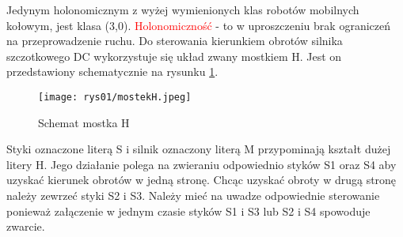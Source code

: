 	Jedynym holonomicznym z wyżej wymienionych klas robotów mobilnych kołowym, jest klasa (3,0). \newline \newline \newline
	\textcolor{red}{Holonomiczność} - to w uproszczeniu brak ograniczeń na przeprowadzenie ruchu.
	\newline \newline \newline
	Do sterowania kierunkiem obrotów silnika szczotkowego DC wykorzystuje się układ zwany mostkiem H. Jest on przedstawiony schematycznie na rysunku \ref{fig:mostekHschemat}. 
	
	\begin{figure}[H]
		\centering
		\texttt{[image: rys01/mostekH.jpeg]} 
		\caption{Schemat mostka H}
		\label{fig:mostekHschemat}
	\end{figure}

	Styki oznaczone literą S i silnik oznaczony literą M przypominają kształt dużej litery H. Jego działanie polega na zwieraniu odpowiednio styków S1 oraz S4 aby uzyskać kierunek obrotów w jedną stronę. Chcąc uzyskać obroty w drugą stronę należy zewrzeć styki S2 i S3. Należy mieć na uwadze odpowiednie sterowanie ponieważ załączenie w jednym czasie styków S1 i S3 lub S2 i S4 spowoduje zwarcie.

